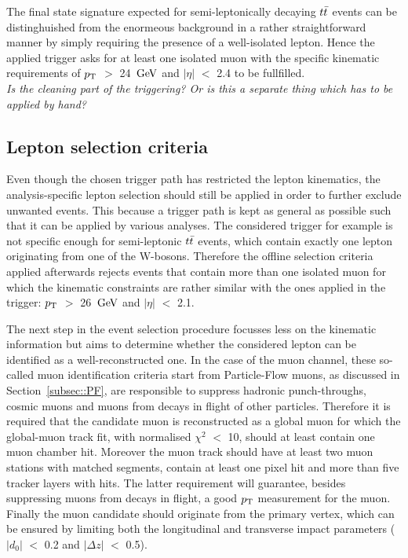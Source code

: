 The final state signature expected for semi-leptonically decaying $t\bar{t}$ events can be distinghuished from the enormeous background in a rather straightforward manner by simply requiring the presence of a well-isolated lepton.
Hence the applied trigger asks for at least one isolated muon with the specific kinematic requirements of $p_{\rm T}$ $>$ 24 $\, \mathrm{GeV}$ and $\vert \eta \vert$ $<$ 2.4 to be fullfilled.
\\
\textit{Is the cleaning part of the triggering? Or is this a separate thing which has to be applied by hand?}

\subsection{Lepton selection criteria}
Even though the chosen trigger path has restricted the lepton kinematics, the analysis-specific lepton selection should still be applied in order to further exclude unwanted events.
This because a trigger path is kept as general as possible such that it can be applied by various analyses.
The considered trigger for example is not specific enough for semi-leptonic $t\bar{t}$ events, which contain exactly one lepton originating from one of the W-bosons.
Therefore the offline selection criteria applied afterwards rejects events that contain more than one isolated muon for which the kinematic constraints are rather similar with the ones applied in the trigger: $p_{\rm T}$ $>$ 26 $\, \mathrm{GeV}$ and $\vert \eta \vert$ $<$ 2.1. 

The next step in the event selection procedure focusses less on the kinematic information but aims to determine whether the considered lepton can be identified as a well-reconstructed one. 
In the case of the muon channel, these so-called muon identification criteria start from Particle-Flow muons, as discussed in Section~\ref{subsec::PF}, are responsible to suppress hadronic punch-throughs, cosmic muons and muons from decays in flight of other particles.
Therefore it is required that the candidate muon is reconstructed as a global muon for which the global-muon track fit, with normalised $\chi^{2}$ $<$ 10, should at least contain one muon chamber hit. 
Moreover the muon track should have at least two muon stations with matched segments, contain at least one pixel hit and more than five tracker layers with hits. The latter requirement will guarantee, besides suppressing muons from decays in flight, a good $p_{\rm T}$ measurement for the muon.
Finally the muon candidate should originate from the primary vertex, which can be ensured by limiting both the longitudinal and transverse impact parameters ($\vert d_0 \vert$ $<$ 0.2 and $\vert \Delta z \vert$ $<$ 0.5).

